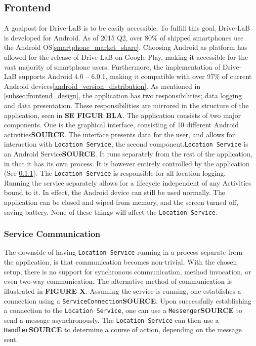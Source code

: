 \subsection{Frontend}\label{subsec:frontend_implementation}
A goalpost for Drive-LaB is to be easily accessible. To fulfill this goal, Drive-LaB is developed for Android. As of 2015 Q2, over 80\% of shipped smartphones use the Android OS\ref{smartphone_market_share}. Choosing Android as platform has allowed for the release of Drive-LaB on Google Play, making it accessible for the vast majority of smartphone users. Furthermore, the implementation of Drive-LaB supports Android 4.0 – 6.0.1, making it compatible with over 97\% of current Android devices\ref{android_version_distribution}.
As mentioned in \ref{subsec:frontend_design}, the application has two responsibilities; data logging and data presentation. These responsibilities are mirrored in the structure of the application, seen in \textbf{SE FIGUR BLA}. The application consists of two major components. One is the graphical interface, consisting of 10 different Android activities\textbf{SOURCE}. The interface presents data for the user, and allows for interaction with \texttt{Location Service}, the second component.\texttt{Location Service} is an Android Service\textbf{SOURCE}. It runs separately from the rest of the application, in that it has its own process. It is however entirely controlled by the application (See \ref{subsubsec:service_communication}). The \texttt{Location Service} is responsible for all location logging. Running the service separately allows for a lifecycle independent of any Activities bound to it. In effect, the Android device can still be used normally. The application can be closed and wiped from memory, and the screen turned off, saving battery. None of these things will affect the \texttt{Location Service}.

\subsubsection{Service Communication}\label{subsubsec:service_communication}
The downside of having \texttt{Location Service} running in a process separate from the application, is that communication becomes non-trivial. With the chosen setup, there is no support for synchronous communication, method invocation, or even two-way communication. The alternative method of communication is illustrated in \textbf{FIGURE X}. Assuming the service is running, one establishes a connection using a \texttt{ServiceConnection}\textbf{SOURCE}. Upon successfully establishing a connection to the \texttt{Location Service}, one can use a \texttt{Messenger}\textbf{SOURCE} to send a message asynchronously. The \texttt{Location Service} can then use a \texttt{Handler}\textbf{SOURCE} to determine a course of action, depending on the message sent.

